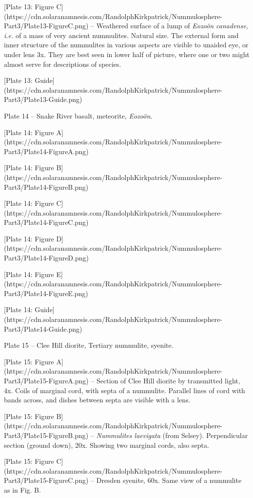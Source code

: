 \documentclass[a4paper, 12pt, oneside]{article}
\begin{document}
[Plate 13: Figure C](https://cdn.solaranamnesis.com/RandolphKirkpatrick/Nummulosphere-Part3/Plate13-FigureC.png) -- Weathered surface of a lump of \emph{Eozoön canadense}, \emph{i.e.} of a mass of very ancient nummulites. Natural size. The external form and inner structure of the nummulites in various aspects are visible to unaided eye, or under lens 3x. They are best seen in lower half of picture, where one or two might almost serve for descriptions of species.

[Plate 13: Guide](https://cdn.solaranamnesis.com/RandolphKirkpatrick/Nummulosphere-Part3/Plate13-Guide.png)

Plate 14 -- Snake River basalt, meteorite, \emph{Eozoön}.

[Plate 14: Figure A](https://cdn.solaranamnesis.com/RandolphKirkpatrick/Nummulosphere-Part3/Plate14-FigureA.png)

[Plate 14: Figure B](https://cdn.solaranamnesis.com/RandolphKirkpatrick/Nummulosphere-Part3/Plate14-FigureB.png)

[Plate 14: Figure C](https://cdn.solaranamnesis.com/RandolphKirkpatrick/Nummulosphere-Part3/Plate14-FigureC.png)

[Plate 14: Figure D](https://cdn.solaranamnesis.com/RandolphKirkpatrick/Nummulosphere-Part3/Plate14-FigureD.png)

[Plate 14: Figure E](https://cdn.solaranamnesis.com/RandolphKirkpatrick/Nummulosphere-Part3/Plate14-FigureE.png)

[Plate 14: Guide](https://cdn.solaranamnesis.com/RandolphKirkpatrick/Nummulosphere-Part3/Plate14-Guide.png)

Plate 15 -- Clee Hill diorite, Tertiary nummulite, syenite.

[Plate 15: Figure A](https://cdn.solaranamnesis.com/RandolphKirkpatrick/Nummulosphere-Part3/Plate15-FigureA.png) -- Section of Clee Hill diorite by transmitted light, 4x. Coils of marginal cord, with septa of a nummulite. Parallel lines of cord with bands across, and dishes between septa are visible with a lens.

[Plate 15: Figure B](https://cdn.solaranamnesis.com/RandolphKirkpatrick/Nummulosphere-Part3/Plate15-FigureB.png) -- \emph{Nummulites laevigata} (from Selsey). Perpendicular section (ground down), 20x. Showing two marginal cords, also septa.

[Plate 15: Figure C](https://cdn.solaranamnesis.com/RandolphKirkpatrick/Nummulosphere-Part3/Plate15-FigureC.png) -- Dresden syenite, 60x. Same view of a nummulite as in Fig. B.
\end{document}
